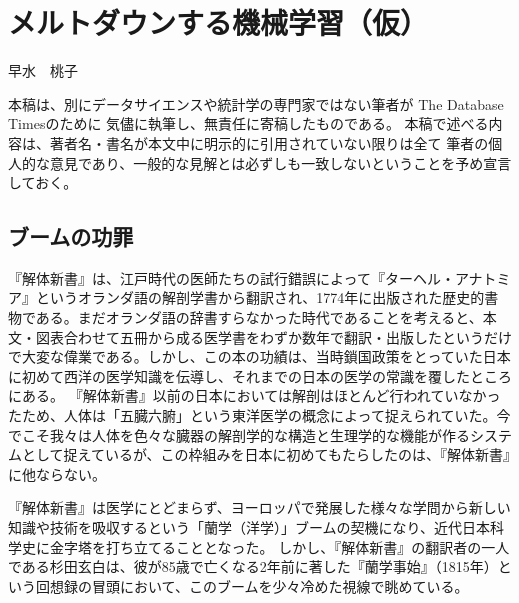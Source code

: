 
\chapter{メルトダウンする機械学習（仮）}

\begin{flushright}
 早水　桃子 %
\end{flushright}

\begin{spacing}{0.6}
\noindent
{\footnotesize{本稿は、別にデータサイエンスや統計学の専門家ではない筆者が
The Database Timesのために
気儘に執筆し、無責任に寄稿したものである。
本稿で述べる内容は、著者名・書名が本文中に明示的に引用されていない限りは全て
筆者の個人的な意見であり、一般的な見解とは必ずしも一致しないということを予め宣言しておく。}}
\end{spacing}
 
\section{ブームの功罪}
『解体新書』は、江戸時代の医師たちの試行錯誤によって『ターヘル・アナトミア』というオランダ語の解剖学書から翻訳され、1774年に出版された歴史的書物である。まだオランダ語の辞書すらなかった時代であることを考えると、本文・図表合わせて五冊から成る医学書をわずか数年で翻訳・出版したというだけで大変な偉業である。しかし、この本の功績は、当時鎖国政策をとっていた日本に初めて西洋の医学知識を伝導し、それまでの日本の医学の常識を覆したところにある。
『解体新書』以前の日本においては解剖はほとんど行われていなかったため、人体は「五臓六腑」という東洋医学の概念によって捉えられていた。今でこそ我々は人体を色々な臓器の解剖学的な構造と生理学的な機能が作るシステムとして捉えているが、この枠組みを日本に初めてもたらしたのは、『解体新書』に他ならない。

『解体新書』は医学にとどまらず、ヨーロッパで発展した様々な学問から新しい知識や技術を吸収するという「蘭学（洋学）」ブームの契機になり、近代日本科学史に金字塔を打ち立てることとなった。
しかし、『解体新書』の翻訳者の一人である杉田玄白は、彼が85歳で亡くなる2年前に著した『蘭学事始』（1815年）という回想録の冒頭において、このブームを少々冷めた視線で眺めている。

